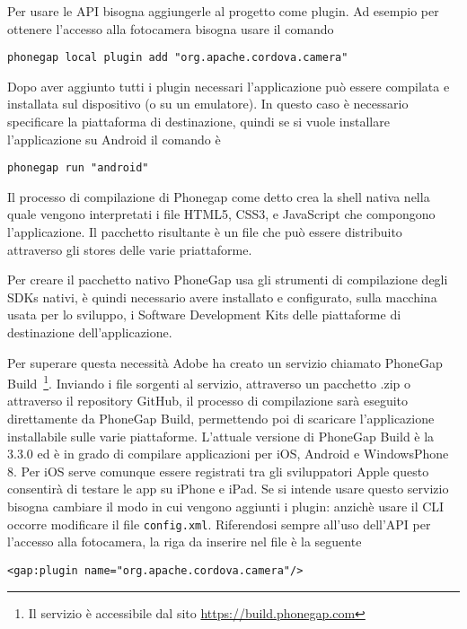 			Per usare le API bisogna aggiungerle al progetto come plugin. Ad 
			esempio per ottenere l'accesso alla fotocamera bisogna usare il comando 
	\begin{lstlisting}[language=MyBash]
	phonegap local plugin add "org.apache.cordova.camera"
	\end{lstlisting}
	
			Dopo aver aggiunto tutti i plugin necessari l'applicazione può 
			essere compilata e installata sul dispositivo (o su un emulatore).
			In questo caso è necessario specificare la piattaforma di destinazione, 
			quindi se si vuole installare l'applicazione su Android il comando è 
	\begin{lstlisting}[language=MyBash]
	phonegap run "android"
	\end{lstlisting}
	
			Il processo di compilazione di Phonegap come detto 
			crea la shell nativa nella quale vengono interpretati i file HTML5, CSS3, e 
			JavaScript che compongono l'applicazione. Il pacchetto 
			risultante è un file che può essere distribuito attraverso gli stores
			delle varie priattaforme.
			
			Per creare il pacchetto nativo PhoneGap usa gli strumenti di compilazione 
			degli SDKs nativi, è quindi necessario avere installato e configurato, 
			sulla macchina 
			usata per lo sviluppo, i Software Development Kits delle piattaforme 
			di destinazione dell'applicazione.
			
			Per superare questa necessità Adobe ha creato un servizio chiamato 
			PhoneGap Build~\footnote{Il servizio è accessibile dal sito 
			\url{https://build.phonegap.com}}. 
			Inviando i file sorgenti al servizio, attraverso un 
			pacchetto .zip o attraverso il repository GitHub, il processo di 
			compilazione sarà eseguito direttamente da PhoneGap Build, permettendo 
			poi di scaricare l'applicazione installabile sulle varie piattaforme.
			L'attuale versione di PhoneGap Build è la 3.3.0 ed è in grado di compilare 
			applicazioni per iOS, Android e WindowsPhone 8. Per iOS serve comunque 
			essere registrati tra gli sviluppatori Apple questo consentirà di 
			testare le app su iPhone e iPad.
			Se si intende usare questo servizio bisogna cambiare il modo in cui 
			vengono aggiunti i plugin: anzichè usare il CLI occorre modificare 
			il file \verb|config.xml|. Riferendosi sempre all'uso dell'API per 
			l'accesso alla fotocamera, la riga da inserire nel file è la seguente
	\begin{lstlisting}[]
	<gap:plugin name="org.apache.cordova.camera"/>
	\end{lstlisting} 
	
